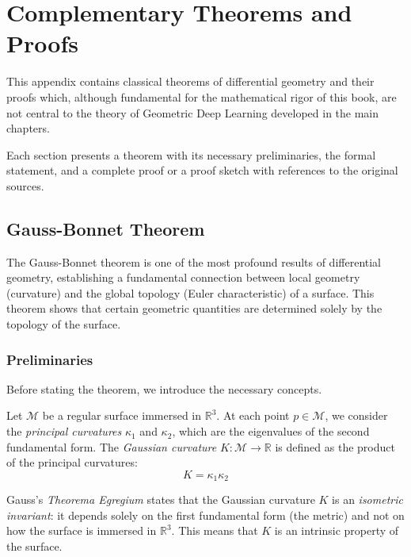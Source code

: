 \chapter{Complementary Theorems and Proofs}\label{ch:teoremas_complementarios}

This appendix contains classical theorems of differential geometry and their proofs which, although fundamental for the mathematical rigor of this book, are not central to the theory of Geometric Deep Learning developed in the main chapters.

Each section presents a theorem with its necessary preliminaries, the formal statement, and a complete proof or a proof sketch with references to the original sources.

\section{Gauss-Bonnet Theorem}\label{sec:gauss_bonnet}

The Gauss-Bonnet theorem is one of the most profound results of differential geometry, establishing a fundamental connection between local geometry (curvature) and the global topology (Euler characteristic) of a surface.  This theorem shows that certain geometric quantities are determined  solely by the topology of the surface.

\subsection{Preliminaries}\label{subsec:gauss_bonnet_preliminares}

Before stating the theorem, we introduce the necessary concepts.

\begin{definition}\label{def:curvatura_gaussiana_apendice}
Let $\mathcal{M}$ be a regular surface immersed in $\mathbb{R}^3$. At each point $p \in \mathcal{M}$, we consider the \textit{principal curvatures} $\kappa_1$ and $\kappa_2$, which are the eigenvalues of the second fundamental form. The \textit{Gaussian curvature} $K: \mathcal{M} \to \mathbb{R}$ is defined as the product of the principal curvatures:
\begin{equation}\label{eq:curvatura_gaussiana}
K = \kappa_1 \kappa_2
\end{equation}
\end{definition}

\begin{remark}
Gauss's \textit{Theorema Egregium} states that the Gaussian curvature $K$ is an \textit{isometric invariant}: it depends solely on the first fundamental form (the metric) and not on how the surface is immersed in $\mathbb{R}^3$. This means that $K$ is an intrinsic property of the surface.
\end{remark}

